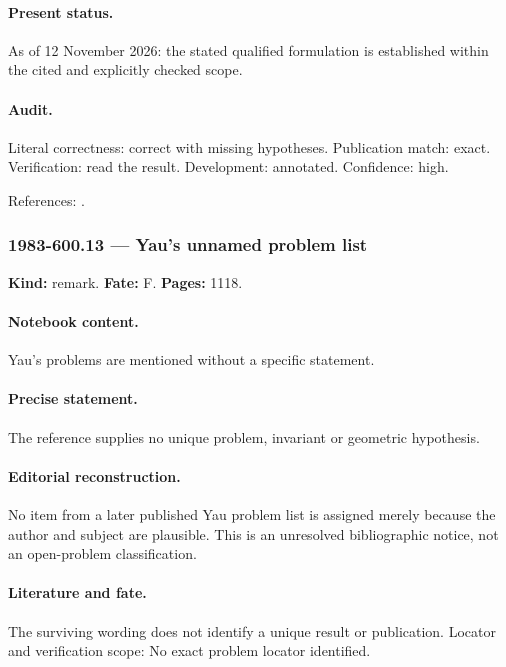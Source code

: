 \paragraph{Present status.} As of 12 November 2026: the stated qualified formulation is established within the cited and explicitly checked scope.

\paragraph{Audit.} Literal correctness: correct with missing hypotheses. Publication match: exact. Verification: read the result. Development: annotated. Confidence: high.

\noindent References: \citep{stanley1980faces,danilov1978toric}.\par

\subsubsection{1983-600.13 --- Yau's unnamed problem list}

\label{item:1983-600.13}

\noindent\textbf{Kind:} remark. \textbf{Fate:} F. \textbf{Pages:} 1118.\par

\paragraph{Notebook content.} Yau's problems are mentioned without a specific statement.

\paragraph{Precise statement.} The reference supplies no unique problem, invariant or geometric hypothesis.

\paragraph{Editorial reconstruction.} No item from a later published Yau problem list is assigned merely because the author and subject are plausible. This is an unresolved bibliographic notice, not an open-problem classification.

\paragraph{Literature and fate.} The surviving wording does not identify a unique result or publication. Locator and verification scope: No exact problem locator identified.

